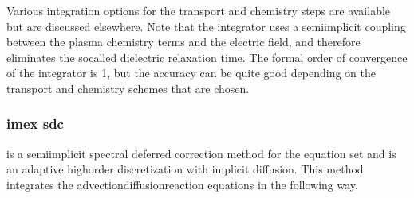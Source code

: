 \documentclass[letterpaper,10pt,english]{sphinxmanual}
\begin{document}
Various integration options for the transport and chemistry steps are available but are discussed elsewhere. Note that the  integrator uses a semi\sphinxhyphen{}implicit coupling between the plasma chemistry terms and the electric field, and therefore eliminates the so\sphinxhyphen{}called dielectric relaxation time. The formal order of convergence of the  integrator is 1, but the accuracy can be quite good depending on the transport and chemistry schemes that are chosen.


\subsubsection{imex sdc}
\label{\detokenize{MinimalPlasmaModel:imex-sdc}}\label{\detokenize{MinimalPlasmaModel:chap-sisdc}}
 is a semi\sphinxhyphen{}implicit spectral deferred correction method for the  equation set and is an adaptive high\sphinxhyphen{}order discretization with implicit diffusion. This method integrates the advection\sphinxhyphen{}diffusion\sphinxhyphen{}reaction equations in the following way.
\end{document}
